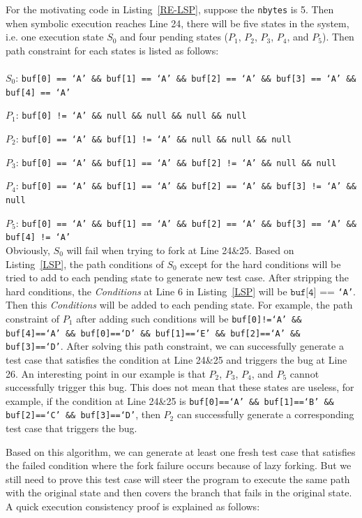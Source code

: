 For the motivating code in Listing~\ref{RE-LSP}, suppose the \texttt{nbytes} is 5. Then when symbolic execution reaches Line 24, there will be five states in the system, i.e. one execution state $S_0$ and four pending states ($P_1$, $P_2$, $P_3$, $P_4$, and $P_5$). 
Then path constraint for each states is listed as follows:
\\
\\
\indent$S_0$: \texttt{buf[0] == `A' \&\& buf[1] == `A' \&\& buf[2] == `A' \&\& buf[3] == `A' \&\& buf[4] == `A'}

$P_1$: \texttt{buf[0] != `A' \&\& null \&\& null  \&\& null  \&\& null}

$P_2$: \texttt{buf[0] == `A' \&\& buf[1] != `A' \&\& null \&\& null  \&\& null}

$P_3$: \texttt{buf[0] == `A' \&\& buf[1] == `A' \&\& buf[2] != `A' \&\& null  \&\& null}

$P_4$: \texttt{buf[0] == `A' \&\& buf[1] == `A' \&\& buf[2] == `A' \&\& buf[3] != `A'  \&\& null}

$P_5$: \texttt{buf[0] == `A' \&\& buf[1] == `A' \&\& buf[2] == `A' \&\& buf[3] == `A'  \&\& buf[4] != `A'}
\\

Obviously, $S_0$ will fail when trying to fork at Line 24\&25. Based on Listing~\ref{LSP}, the path conditions of $S_0$ except for the hard conditions will be tried to add to each pending state to generate new test case. After stripping the hard conditions, the \textit{Conditions} at Line 6 in Listing~\ref{LSP} will be $\texttt{buf[4]}$ == \texttt{`A'}. Then this \textit{Conditions} will be added to each pending state. For example, the path constraint of $P_1$ after adding such conditions will be \texttt{buf[0]!=`A' \&\& buf[4]==`A' \&\& buf[0]==`D' \&\& buf[1]==`E' \&\& buf[2]==`A' \&\& buf[3]==`D'}. After solving this path constraint, we can successfully generate a test case that satisfies the condition at Line 24\&25 and triggers the bug at Line 26. 
An interesting point in our example is that $P_2$, $P_3$, $P_4$, and $P_5$ cannot successfully trigger this bug. This does not mean that these states are useless, for example, if the condition at Line 24\&25 is \texttt{buf[0]==`A' \&\& buf[1]==`B' \&\& buf[2]==`C' \&\& buf[3]==`D'}, then $P_2$ can successfully generate a corresponding test case that triggers the bug.

Based on this algorithm, we can generate at least one fresh test case that satisfies the failed condition where the fork failure occurs because of lazy forking. But we still need to prove this test case will steer the program to execute the same path with the original state and then covers the branch that fails in the original state. A quick execution consistency proof is explained as follows:

